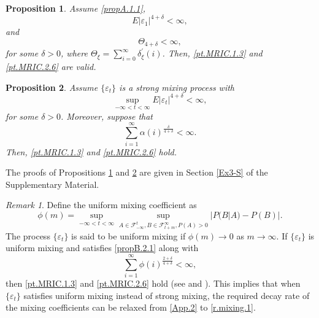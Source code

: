 \documentclass[ejsv2]{imsart}
\theoremstyle{plain}
\newtheorem{proposition}{Proposition}[section]
\theoremstyle{definition}
\theoremstyle{remark}
\newtheorem{remark}{Remark}[section]
\begin{document}

\begin{proposition}\label{propB.1}
Assume \eqref{propA.1.1},
\begin{equation}\label{propB.1.1}
E|\varepsilon_1|^{4+\delta}<\infty,
\end{equation}
and
\begin{equation}\label{propB.1.2}
\Theta_{4+\delta}<\infty,
\end{equation}
for some ${\delta}>0$, where $\Theta_{\xi}=
\sum_{i=0}^{\infty}\delta^\prime_{\xi}(i)$. Then, \eqref{pt.MRIC.1.3} and \eqref{pt.MRIC.2.6} are valid.
\end{proposition}

\begin{proposition}\label{propB.2}
Assume $\{\varepsilon_t\}$ is a strong mixing process with 
\begin{equation}\label{propB.2.1}
\sup\limits_{-\infty<t<\infty}E|\varepsilon_t|^{4+{\delta}}<\infty,
\end{equation}
for some ${\delta}>0$. Moreover, suppose that
\begin{equation}\label{App.2}
\sum_{i=1}^{\infty}\alpha(i)^{\frac{{\delta}}{4+{\delta}}}<\infty.
\end{equation}
Then, \eqref{pt.MRIC.1.3} and \eqref{pt.MRIC.2.6} hold.
\end{proposition}

The proofs of Propositions \ref{propB.1} and \ref{propB.2} are given in Section \ref{Ex3-S} of the Supplementary Material.

\begin{remark}\label{rm.mixing}
Define the uniform mixing coefficient as
$$\phi(m)=\sup\limits_{-\infty<t<\infty}\sup\limits_{A\in\mathcal{F}_{-\infty}^t,B\in\mathcal{F}_{t+m}^\infty,P(A)>0}|P(B|A)-P(B)|.$$
The process $\{\varepsilon_t\}$ is said to be uniform mixing if $\phi(m) \to 0$ as $m \to \infty$. If $\{\varepsilon_t\}$ is uniform mixing and satisfies \eqref{propB.2.1} along with
\begin{equation}\label{r.mixing.1} 
\sum_{i=1}^{\infty} \phi(i)^{\frac{2+{\delta}}{4+{\delta}}} < \infty, 
\end{equation}
then \eqref{pt.MRIC.1.3} and \eqref{pt.MRIC.2.6} hold (see \cite{Andrews1988M} and \cite{Kim1994M}). This implies that when $\{\varepsilon_t\}$ satisfies uniform mixing instead of strong mixing, the required decay rate of the mixing coefficients can be relaxed from \eqref{App.2} to \eqref{r.mixing.1}.
\end{remark}
\end{document}
